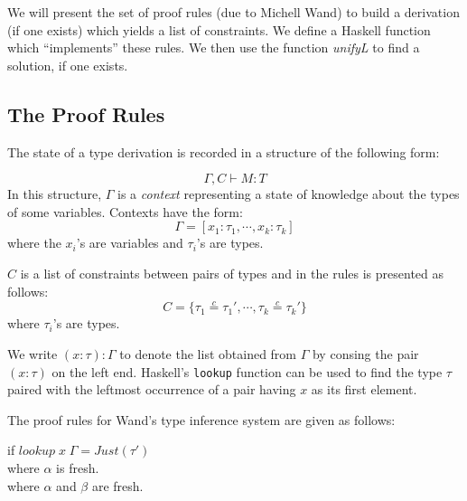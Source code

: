 \documentclass[11pt]{article}
\begin{document}
We will present the set of proof rules (due to Michell Wand) to build a
derivation (if one exists) which yields a list of constraints.  We define a
Haskell function which ``implements'' these rules.  We then use the function
{\it{unifyL}} to find a solution, if one exists.

\subsection{The Proof Rules}

The state of a type derivation is recorded in a structure of the following
form:

\[\Gamma,C \vdash M : T\]
In this structure, $\Gamma$ is a {\em{context}} representing a state of
knowledge about the types of some variables.  Contexts have the form:
 \[\Gamma = [x_1:\tau_1,\cdots{},x_k:\tau_k]\]
where the $x_i$'s are variables and $\tau_i$'s are types.

$C$ is a list of constraints between pairs
of types and in the rules is presented as follows:
\[C=\{\tau_1 \stackrel{c}{=}\tau_1', \cdots , \tau_k \stackrel{c}{=} \tau_k'\}\]
where $\tau_i$'s are types.  

We write $(x:\tau):\Gamma$ to denote the list obtained from $\Gamma$ by consing
the pair $(x:\tau)$ on the left end.  Haskell's {\tt{lookup}} function can be
used to find the type $\tau$ paired with the leftmost occurrence of a pair
having $x$ as its first element.

The proof rules for Wand's type inference system are given as follows:


 {\hspace{.25in}} if $lookup \;x \;\Gamma = Just(\tau')$ 
\vspace{.125in}\\


{\hspace{.25in}} where $\alpha$ is fresh.
\vspace{.125in}\\

{\hspace{.25in}} where $\alpha$ and $\beta$ are fresh.
\vspace{.125in}\\
\end{document}
